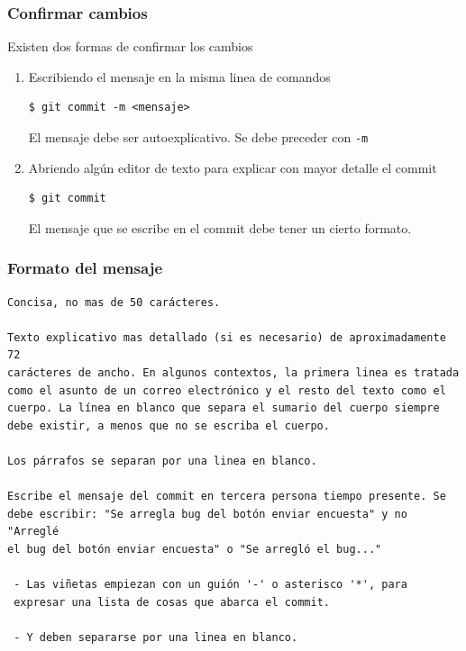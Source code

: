 \documentclass[10pt]{beamer}
\begin{document}
\begin{frame}[fragile]
	\frametitle{Confirmar cambios}
	Existen dos formas de confirmar los cambios

	\begin{enumerate}[<+(1)->]
		\item{
				Escribiendo el mensaje en la misma linea de comandos
\begin{lstlisting}
$ git commit -m <mensaje>
\end{lstlisting}
				El mensaje debe ser autoexplicativo. Se debe preceder con 
				\texttt{-m}
			}
		\item{
				Abriendo algún editor de texto para explicar con mayor detalle 
				el commit
\begin{lstlisting}
$ git commit
\end{lstlisting}
				El mensaje que se escribe en el commit debe tener un cierto 
				formato.
			}
	\end{enumerate}
\end{frame}

\begin{frame}[fragile]
	\frametitle{Formato del mensaje}

	\begin{center}
\begin{Verbatim}[fontsize=\footnotesize]
Concisa, no mas de 50 carácteres.

Texto explicativo mas detallado (si es necesario) de aproximadamente 72 
carácteres de ancho. En algunos contextos, la primera linea es tratada 
como el asunto de un correo electrónico y el resto del texto como el 
cuerpo. La línea en blanco que separa el sumario del cuerpo siempre 
debe existir, a menos que no se escriba el cuerpo.

Los párrafos se separan por una linea en blanco.

Escribe el mensaje del commit en tercera persona tiempo presente. Se 
debe escribir: "Se arregla bug del botón enviar encuesta" y no "Arreglé 
el bug del botón enviar encuesta" o "Se arregló el bug..."

 - Las viñetas empiezan con un guión '-' o asterisco '*', para 
 expresar una lista de cosas que abarca el commit.

 - Y deben separarse por una linea en blanco.
\end{Verbatim}
	\end{center}
\end{frame}
\end{document}

